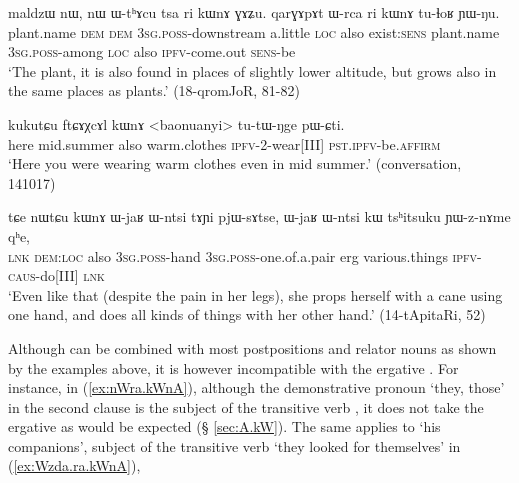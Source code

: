     \begin{exe}
\ex \label{ex:ri.kWnA}
\gll   maldzɯ nɯ, nɯ ɯ-tʰɤcu tsa ri kɯnɤ ɣɤʑu. qarɣɤpɤt ɯ-rca ri kɯnɤ tu-ɬoʁ ɲɯ-ŋu. \\
plant.name \textsc{dem} \textsc{dem} \textsc{3sg}.\textsc{poss}-downstream a.little \textsc{loc} also exist:\textsc{sens} plant.name \textsc{3sg}.\textsc{poss}-among \textsc{loc} also \textsc{ipfv}-come.out \textsc{sens}-be \\
\glt `The  plant, it is also found in places of slightly lower altitude, but grows also in the same places as   plants.' (18-qromJoR, 81-82)
    \end{exe}
    
\begin{exe}
\ex \label{ex:ftCAXcAl.kWnA}
\gll   kukutɕu ftɕɤχcɤl kɯnɤ <baonuanyi> tu-tɯ-ŋge pɯ-ɕti. \\
  here mid.summer also warm.clothes \textsc{ipfv}-2-wear[III] \textsc{pst}.\textsc{ipfv}-be.\textsc{affirm} \\
  \glt `Here you were wearing warm clothes even in mid summer.' (conversation, 141017)
    \end{exe}
    
    \begin{exe}
\ex \label{ex:nWtCu.kWnA}
\gll    tɕe nɯtɕu kɯnɤ ɯ-jaʁ ɯ-ntsi tɤɲi pjɯ-sɤtse, ɯ-jaʁ ɯ-ntsi kɯ tsʰitsuku ɲɯ-z-nɤme qʰe, \\
\textsc{lnk} \textsc{dem}:\textsc{loc} also \textsc{3sg}.\textsc{poss}-hand \textsc{3sg}.\textsc{poss}-one.of.a.pair erg various.things \textsc{ipfv}-\textsc{caus}-do[III] \textsc{lnk}  \\
\glt `Even like that (despite the pain in her legs), she props herself with a cane using one hand, and does all kinds of things with her other hand.' (14-tApitaRi, 52)
\end{exe}

Although  can be combined with most postpositions and relator nouns as shown by the examples above, it is however incompatible with the ergative . For instance, in  (\ref{ex:nWra.kWnA}), although the demonstrative pronoun  `they, those' in the second clause is the subject of the transitive verb , it does not take the ergative  as would be expected (§ \ref{sec:A.kW}). The same applies to  `his companions', subject of the transitive verb  `they looked for themselves' in (\ref{ex:Wzda.ra.kWnA}), 

